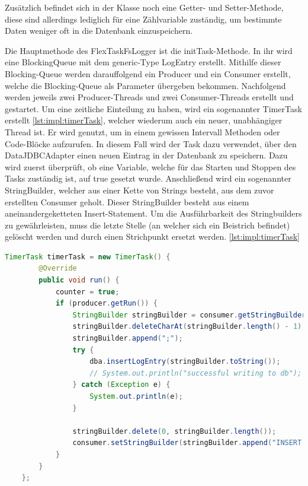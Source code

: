 Zusätzlich befindet sich in der Klasse noch eine Getter- und Setter-Methode, diese sind allerdings lediglich für eine Zählvariable zuständig, um bestimmte Daten weniger oft in die Datenbank einzuspeichern.

Die Hauptmethode des FlexTaskFsLogger ist die initTask-Methode. In ihr wird eine BlockingQueue mit dem generic-Type LogEntry erstellt. Mithilfe dieser Blocking-Queue werden darauffolgend ein Producer und ein Consumer erstellt, welche die Blocking-Queue als Parameter übergeben bekommen. Nachfolgend werden jeweils zwei Producer-Threads und zwei Consumer-Threads erstellt und gestartet. Um eine zeitliche Einteilung zu haben, wird ein sogenannter TimerTask erstellt \ref{lst:impl:timerTask}, welcher wiederum auch ein neuer, unabhängiger Thread ist. Er wird genutzt, um in einem gewissen Intervall Methoden oder Code-Blöcke aufzurufen. In diesem Fall wird der Task dazu verwendet, über den DataJDBCAdapter einen neuen Eintrag in der Datenbank zu speichern. Dazu wird zuerst überprüft, ob eine Variable, welche für das Starten und Stoppen des Tasks zuständig ist, auf true gesetzt wurde. Anschließend wird ein sogenannter StringBuilder, welcher aus einer Kette von Strings besteht, aus dem zuvor erstellten Consumer geholt. Dieser StringBuilder besteht aus einem aneinandergeketteten Insert-Statement. Um die Ausführbarkeit des Stringbuilders zu gewährleisten, muss die letzte Stelle (an welcher sich ein Beistrich befindet) gelöscht werden und durch einen Strichpunkt ersetzt werden. \ref{lst:impl:timerTask}


\begin{lstlisting}[language=java,caption=TimerTask,label=lst:impl:timerTask]
    TimerTask timerTask = new TimerTask() {
        @Override
        public void run() {
            counter = true;
            if (producer.getRun()) {
                StringBuilder stringBuilder = consumer.getStringBuilder();
                stringBuilder.deleteCharAt(stringBuilder.length() - 1);
                stringBuilder.append(";");
                try {
                    dba.insertLogEntry(stringBuilder.toString());
                    // System.out.println("successful writing to db");
                } catch (Exception e) {
                    System.out.println(e);
                }

                stringBuilder.delete(0, stringBuilder.length());
                consumer.setStringBuilder(stringBuilder.append("INSERT INTO flexlogger(dp_name, value, unit, timestamp) VALUES "));
            }
        }
    }; 
\end{lstlisting}


